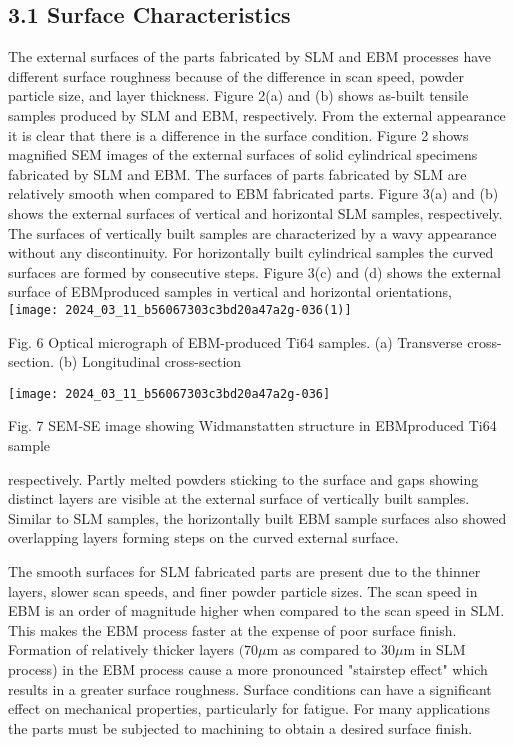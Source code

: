\documentclass[10pt]{article}
\begin{document}
\subsection*{3.1 Surface Characteristics}
The external surfaces of the parts fabricated by SLM and EBM processes have different surface roughness because of the difference in scan speed, powder particle size, and layer thickness. Figure 2(a) and (b) shows as-built tensile samples produced by SLM and EBM, respectively. From the external appearance it is clear that there is a difference in the surface condition. Figure 2 shows magnified SEM images of the external surfaces of solid cylindrical specimens fabricated by SLM and EBM. The surfaces of parts fabricated by SLM are relatively smooth when compared to EBM fabricated parts. Figure 3(a) and (b) shows the external surfaces of vertical and horizontal SLM samples, respectively. The surfaces of vertically built samples are characterized by a wavy appearance without any discontinuity. For horizontally built cylindrical samples the curved surfaces are formed by consecutive steps. Figure 3(c) and (d) shows the external surface of EBMproduced samples in vertical and horizontal orientations,\\
\texttt{[image: 2024\_03\_11\_b56067303c3bd20a47a2g-036(1)]}

Fig. 6 Optical micrograph of EBM-produced Ti64 samples. (a) Transverse cross-section. (b) Longitudinal cross-section

\begin{center}
\texttt{[image: 2024\_03\_11\_b56067303c3bd20a47a2g-036]}
\end{center}

Fig. 7 SEM-SE image showing Widmanstatten structure in EBMproduced Ti64 sample

respectively. Partly melted powders sticking to the surface and gaps showing distinct layers are visible at the external surface of vertically built samples. Similar to SLM samples, the horizontally built EBM sample surfaces also showed overlapping layers forming steps on the curved external surface.

The smooth surfaces for SLM fabricated parts are present due to the thinner layers, slower scan speeds, and finer powder particle sizes. The scan speed in EBM is an order of magnitude higher when compared to the scan speed in SLM. This makes the EBM process faster at the expense of poor surface finish. Formation of relatively thicker layers $(70 \mu \mathrm{m}$ as compared to $30 \mu \mathrm{m}$ in SLM process) in the EBM process cause a more pronounced "stairstep effect" which results in a greater surface roughness. Surface conditions can have a significant effect on mechanical properties, particularly for fatigue. For many applications the parts must be subjected to machining to obtain a desired surface finish.
\end{document}
